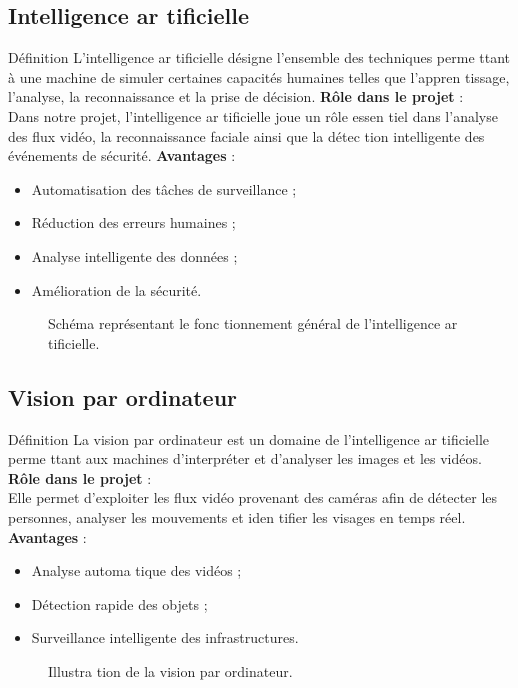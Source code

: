 \documentclass[12pt,a4paper]{report}
\numberwithin{figure}{chapter}
\numberwithin{table}{chapter}
\begin{document}
\subsection{Intelligence ar tiﬁcielle}
Déﬁnition
L’intelligence ar tiﬁcielle désigne l’ensemble des techniques perme ttant à une machine de simuler
certaines capacités humaines telles que l’appren tissage, l’analyse, la reconnaissance et la prise de
décision.
\textbf{Rôle dans le projet} : \\
Dans notre projet, l’intelligence ar tiﬁcielle joue un rôle essen tiel dans l’analyse des ﬂux vidéo, la
reconnaissance faciale ainsi que la détec tion intelligente des événements de sécurité.
\textbf{Avantages} : \\
\begin{itemize}
  \item Automatisation des tâches de surveillance ;
  \item Réduction des erreurs humaines ;
  \item Analyse intelligente des données ;
  \item Amélioration de la sécurité.
\end{itemize}
\begin{figure}[H]
  \centering
  \caption{Schéma représentant le fonc tionnement général de l’intelligence ar tiﬁcielle.}
\end{figure}
\subsection{Vision par ordinateur}
Déﬁnition
La vision par ordinateur est un domaine de l’intelligence ar tiﬁcielle perme ttant aux machines
d’interpréter et d’analyser les images et les vidéos.
\textbf{Rôle dans le projet} : \\
Elle permet d’exploiter les ﬂux vidéo provenant des caméras aﬁn de détecter les personnes, analyser
les mouvements et iden tiﬁer les visages en temps réel.
\textbf{Avantages} : \\
\begin{itemize}
  \item Analyse automa tique des vidéos ;
  \item Détection rapide des objets ;
  \item Surveillance intelligente des infrastructures.
\end{itemize}
\begin{figure}[H]
  \centering
  \caption{Illustra tion de la vision par ordinateur.}
\end{figure}
\end{document}
